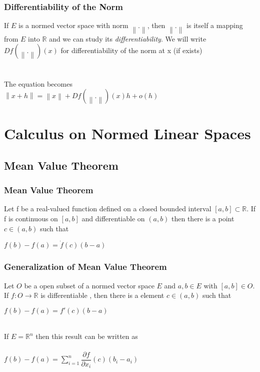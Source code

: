 \documentclass{beamer}
\newcommand{\R}{\mathbb{R}}
\newcommand\norm[1]{\left\lVert#1\right\rVert}
\begin{document}

\begin{frame} %
\frametitle{Differentiability of the Norm}

If $E$ is a normed vector space with norm $\norm{.}$, then $\norm{.}$ is itself a mapping from $E$ into $\R$ and we can study its \textit{differentiability}. We will write $Df(\norm{.}) (x)$ for differentiability of the norm at x (if exists) \\~\\~\\

The equation becomes \\

$\norm{x + h} = \norm{x} + Df(\norm{.})(x)h + o(h) $


\end{frame}
\section{Calculus on Normed Linear Spaces}
\subsection{Mean Value Theorem}

\begin{frame}
\frametitle{Mean Value Theorem}
Let f be a real-valued function defined on a closed bounded interval $[a,b] \subset \R$. If f is continuous on $[a,b] $ and differentiable on $(a,b) $ then there is a point $c \in (a,b)$ such that
\begin{center}
$ f(b) - f(a) = \dot{f}(c)(b-a)$
\end{center}
\end{frame}

\begin{frame}
\frametitle{Generalization of Mean Value Theorem}

Let $O$ be a open subset of a normed vector space $E$ and $a,b \in E$ with $[a,b] \in O$. If $f:O \to \R$ is differentiable , then there is a element $c \in (a,b)$ such that 
\begin{center}
$ f(b) - f(a) = f'(c)(b-a)$
\end{center}
\\

If $E = \R^n$ then this result can be written as\\~\\
\hspace*{2cm}	$f(b) - f(a) = \sum_{i=1}^{n} \dfrac{\partial f}{\partial x_i}(c)(b_i - a_i)$

\end{frame}
\end{document}
